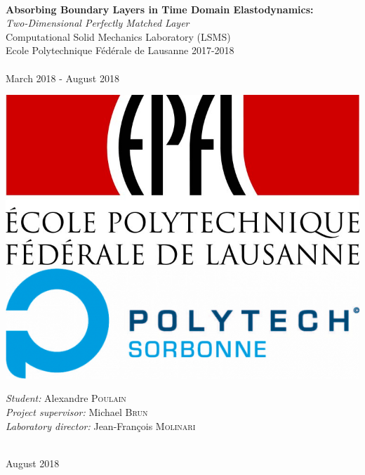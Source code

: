 \begin{titlepage}
\begin{sffamily}
\begin{center}
    \vspace*{2cm}
    \noindent\hrulefill \\
    \vspace*{1cm}
    {\huge \bfseries Absorbing Boundary Layers in Time Domain Elastodynamics: }\\[0.5cm]
    {\huge  \itshape Two-Dimensional Perfectly Matched Layer} \\[0.5cm]
    {\large Computational Solid Mechanics Laboratory  (LSMS)}\\[0.5cm]
    {\large Ecole Polytechnique Fédérale de Lausanne 2017-2018}\\[1cm]
    \noindent\hrulefill \\
    \vspace{1cm}
    March 2018 - August 2018   \\[1cm] 
\begin{minipage}{.5\textwidth}
  \centering
  \includegraphics[width=.98\linewidth]{images/EPFL-Logo.jpg}\\[0.3cm]
  \includegraphics[width=.98\linewidth]{images/polytech-s-logo.jpeg}
\end{minipage}%
\begin{minipage}{.5\textwidth}
  \centering
  \emph{Student:} Alexandre \textsc{Poulain}\\[1cm]
    \emph{Project supervisor:} Michael \textsc{Brun}\\[1cm]
    \emph{Laboratory director:} Jean-François \textsc{Molinari}

\end{minipage}\\[1cm]

      

    

    
    
    \vfill{\large August 2018}

\end{center}
\end{sffamily}
\end{titlepage}